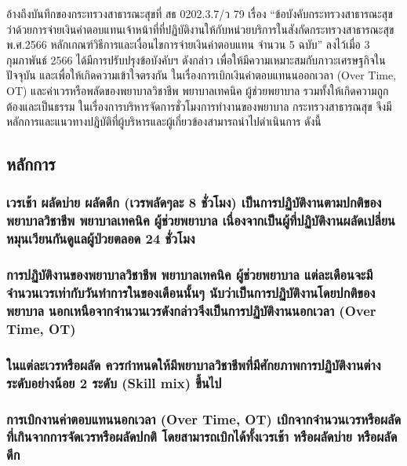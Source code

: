\vspace{0.25cm}


อ้างถึงบันทึกของกระทรวงสาธารณะสุขที่ สธ 0202.3.7/ว 79 เรื่อง “ข้อบังคับกระทรวงสาธารณะสุขว่าด้วยการจ่ายเงินค่าตอบแทนเจ้าหน้าที่ที่ปฏิบัติงานให้กับหน่วยบริการในสังกัดกระทรวงสาธารณะสุข พ.ศ.2566 หลักเกณฑ์วิธีการและเงื่อนไขการจ่ายเงินค่าตอบแทน จำนวน 5 ฉบับ” ลงไว้เมื่อ 3 กุมภาพันธ์ 2566 ได้มีการปรับปรุงข้อบังคับฯ ดังกล่าว เพื่อให้มีความเหมาะสมกับภาวะเศรษฐกิจในปัจจุบัน และเพื่อให้เกิดความเข้าใจตรงกัน ในเรื่องการเบิกเงินค่าตอบแทนนออกเวลา (Over Time, OT) และค่าเวรหรือพลัดของพยาบาลวิชาชีพ พยาบาลเทคนิค ผู้ช่วยพยาบาล รวมทั้งให้เกิดความถูกต้องและเป็นธรรม ในเรื่องการบริหารจัดการชั่วโมงการทำงานของพยาบาล กระทรวงสาธารณสุข จึงมีหลักการและแนวทางปฎิบัติที่ผู้บริหารและผู้เกี่ยวข้องสามารถนำไปดำเนินการ ดังนี้

\hspace{0pt}\subsection{หลักการ}


\hspace{0.5cm}\hangindent=2.6cm\subsubsection{เวรเช้า ผลัดบ่าย ผลัดดึก (เวรพลัดๆละ 8 ชั่วโมง) เป็นการปฏิบัติงานตามปกติของพยาบาลวิชาชีพ พยาบาลเทคนิค ผู้ช่วยพยาบาล เนื่องจากเป็นผู้ที่ปฏิบัติงานผลัดเปลี่ยนหมุนเวียนกันดูแลผู้ป่วยตลอด 24 ชั่วโมง}

\hspace{0.5cm}\hangindent=2.6cm\subsubsection{การปฏิบัติงานของพยาบาลวิชาชีพ พยาบาลเทคนิค ผู้ช่วยพยาบาล แต่ละเดือนจะมีจำนวนเวรเท่ากับวันทำการในของเดือนนั้นๆ นับว่าเป็นการปฏิบัติงานโดยปกติของพยาบาล นอกเหนือจากจำนวนเวรดังกล่าวจึงเป็นการปฏิบัติงานนอกเวลา (Over Time, OT)}

\hspace{0.5cm}\hangindent=2.6cm\subsubsection{ในแต่ละเวรหรือผลัด ควรกำหนดให้มีพยาบาลวิชาชีพที่มีศักยภาพการปฏิบัติงานต่างระดับอย่างน้อย 2 ระดับ (Skill mix) ขึ้นไป}

\hspace{0.5cm}\hangindent=2.6cm\subsubsection{การเบิกงานค่าตอบแทนนอกเวลา (Over Time, OT) เบิกจากจำนวนเวรหรือผลัดที่เกินจากการจัดเวรหรือผลัดปกติ โดยสามารถเบิกได้ทั้งเวรเช้า หรือผลัดบ่าย หรือผลัดดึก}

